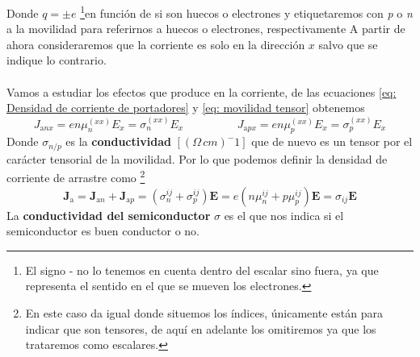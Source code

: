 Donde $q=\pm e$ \footnote{El signo - no lo tenemos en cuenta dentro del escalar sino fuera, ya que representa el sentido en el que se mueven los electrones.}en función de si son huecos o electrones y etiquetaremos con \textit{p} o \textit{n} a la movilidad para referirnos a huecos o electrones, respectivamente A partir de ahora consideraremos que la corriente es solo en la dirección $x$ salvo que se indique lo contrario.\\\\
Vamos a estudiar los efectos que produce en la corriente, de las ecuaciones \ref{eq: Densidad de corriente de portadores} y \ref{eq: movilidad tensor} obtenemos
\begin{equation}
    J_{\mathrm{a}n x}=en\mu_n^{(xx)}E_x=\sigma_n^{(xx)}E_x \hspace{2cm}J_{\mathrm{a}p x}=en\mu_p^{(xx)}E_x=\sigma_p^{(xx)}E_x 
\end{equation}
Donde $\sigma_{n/p}$ es la \textbf{conductividad} $[\unit{(\Omega \, cm)^-1}]$ que de nuevo es un tensor por el carácter tensorial de la movilidad. Por lo que podemos definir la densidad de corriente de arrastre como  \footnote{En este caso da igual donde situemos los índices, únicamente están para indicar que son tensores, de aquí en adelante los omitiremos ya que los trataremos como escalares.}
\begin{equation}
    \mathbf{J}_\mathrm{a}=\mathbf{J}_{\mathrm{a}n}+\mathbf{J}_{\mathrm{a}p}=(\sigma_n^{ij}+\sigma_p^{ij})\textbf{E}=e(n\mu_n^{ij}+p\mu_p^{ij})\mathbf{E}=\sigma_{ij}\mathbf{E}
    \label{eq: conductividad de semiconductor}
\end{equation}
La \textbf{conductividad del semiconductor} $\sigma$ es el que nos indica si el semiconductor es buen conductor o no.
